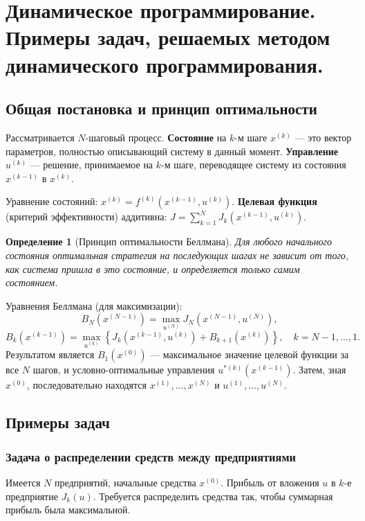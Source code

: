 \documentclass{article}
\theoremstyle{plain}
\newtheorem{definition}[theorem]{Определение}
\begin{document}
\section{Динамическое программирование. Примеры задач, решаемых методом динамического программирования.}

\subsection{Общая постановка и принцип оптимальности}
Рассматривается $N$-шаговый процесс. \textbf{Состояние} на $k$-м шаге $x^{(k)}$ — это вектор параметров, полностью описывающий систему в данный момент. \textbf{Управление} $u^{(k)}$ — решение, принимаемое на $k$-м шаге, переводящее систему из состояния $x^{(k-1)}$ в $x^{(k)}$.

Уравнение состояний: $x^{(k)} = f^{(k)}(x^{(k-1)}, u^{(k)})$. \textbf{Целевая функция} (критерий эффективности) аддитивна: $J = \sum_{k=1}^N J_k(x^{(k-1)}, u^{(k)})$.

\begin{definition}[Принцип оптимальности Беллмана]
Для любого начального состояния оптимальная стратегия на последующих шагах не зависит от того, как система пришла в это состояние, и определяется только самим состоянием.
\end{definition}

Уравнения Беллмана (для максимизации):
\[
B_N(x^{(N-1)}) = \max_{u^{(N)}} J_N(x^{(N-1)}, u^{(N)}),
\]
\[
B_k(x^{(k-1)}) = \max_{u^{(k)}} \left\{ J_k(x^{(k-1)}, u^{(k)}) + B_{k+1}(x^{(k)}) \right\},\quad k = N-1,\dots,1.
\]
Результатом является $B_1(x^{(0)})$ — максимальное значение целевой функции за все $N$ шагов, и условно-оптимальные управления $u^{*(k)}(x^{(k-1)})$. Затем, зная $x^{(0)}$, последовательно находятся $x^{(1)},\dots,x^{(N)}$ и $u^{(1)},\dots,u^{(N)}$.

\subsection{Примеры задач}

\subsubsection{Задача о распределении средств между предприятиями}
Имеется $N$ предприятий, начальные средства $x^{(0)}$. Прибыль от вложения $u$ в $k$-е предприятие $J_k(u)$. Требуется распределить средства так, чтобы суммарная прибыль была максимальной.
\end{document}

